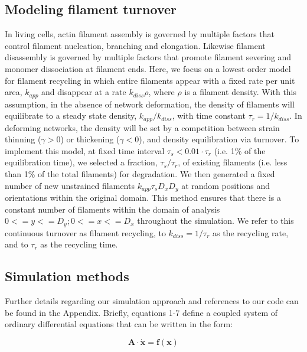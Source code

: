 \documentclass[10pt,letterpaper]{article}
\begin{document}
\subsection*{Modeling filament turnover}

In living cells, actin filament assembly is governed by multiple factors that control filament nucleation, branching and elongation. Likewise filament disassembly is governed by multiple factors that promote filament severing and monomer dissociation at filament ends. Here, we focus on a lowest order model for filament recycling in which entire filaments appear with a fixed rate per unit area, $k_{app}$ and disappear at a rate $k_{diss}\rho$, where $\rho$ is a filament density. With this assumption, in the absence of network deformation, the density of filaments will equilibrate to a steady state density, $k_{app}/k_{diss}$, with time constant $\tau_r = 1/k_{diss}$.   In deforming networks, the density will be set by a competition between strain thinning ($\gamma>0$) or thickening ($\gamma<0$), and density equilibration via turnover. To implement this model, at fixed time interval $\tau_s < 0.01\cdot\tau_r$ (i.e. 1\% of the equilibration time), we selected a fraction, $\tau_s/\tau_r$, of existing filaments (i.e. less than 1\% of the total filaments) for degradation. We then generated a fixed number of new unstrained filaments $k_{app}\tau_sD_xD_y$ at random positions and orientations within the original domain.   This method ensures that there is a constant number of filaments within the domain of analysis $0<=y<=D_y; 0<=x<=D_x$ throughout the simulation. We refer to this continuous turnover as filament recycling, to $k_{diss}=1/\tau_r$ as the recycling rate, and to $\tau_r$ as the recycling time.


\subsection*{Simulation methods}

Further details regarding our simulation approach and references to our code can be found in the Appendix. Briefly, equations 1-7 define a coupled system of ordinary differential equations that can be written in the form:

\begin{equation}
\mathbf{A \cdot \dot x} = \mathbf{f(x)}
\end{equation}
\end{document}
